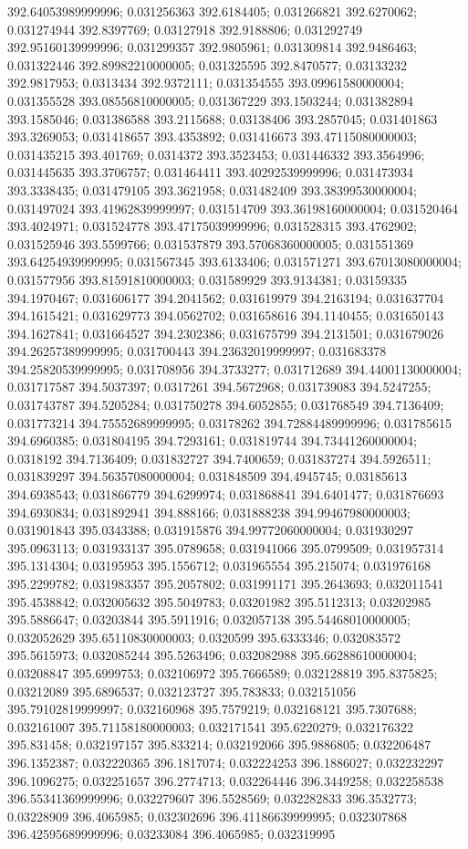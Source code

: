 392.64053989999996; 0.031256363 392.6184405; 0.031266821 392.6270062; 0.031274944 392.8397769; 0.03127918 392.9188806; 0.031292749 392.95160139999996; 0.031299357 392.9805961; 0.031309814 392.9486463; 0.031322446 392.89982210000005; 0.031325595 392.8470577; 0.03133232 392.9817953; 0.0313434 392.9372111; 0.031354555 393.09961580000004; 0.031355528 393.08556810000005; 0.031367229 393.1503244; 0.031382894 393.1585046; 0.031386588 393.2115688; 0.03138406 393.2857045; 0.031401863 393.3269053; 0.031418657 393.4353892; 0.031416673 393.47115080000003; 0.031435215 393.401769; 0.0314372 393.3523453; 0.031446332 393.3564996; 0.031445635 393.3706757; 0.031464411 393.40292539999996; 0.031473934 393.3338435; 0.031479105 393.3621958; 0.031482409 393.38399530000004; 0.031497024 393.41962839999997; 0.031514709 393.36198160000004; 0.031520464 393.4024971; 0.031524778 393.47175039999996; 0.031528315 393.4762902; 0.031525946 393.5599766; 0.031537879 393.57068360000005; 0.031551369 393.64254939999995; 0.031567345 393.6133406; 0.031571271 393.67013080000004; 0.031577956 393.81591810000003; 0.031589929 393.9134381; 0.03159335 394.1970467; 0.031606177 394.2041562; 0.031619979 394.2163194; 0.031637704 394.1615421; 0.031629773 394.0562702; 0.031658616 394.1140455; 0.031650143 394.1627841; 0.031664527 394.2302386; 0.031675799 394.2131501; 0.031679026 394.26257389999995; 0.031700443 394.23632019999997; 0.031683378 394.25820539999995; 0.031708956 394.3733277; 0.031712689 394.44001130000004; 0.031717587 394.5037397; 0.0317261 394.5672968; 0.031739083 394.5247255; 0.031743787 394.5205284; 0.031750278 394.6052855; 0.031768549 394.7136409; 0.031773214 394.75552689999995; 0.03178262 394.72884489999996; 0.031785615 394.6960385; 0.031804195 394.7293161; 0.031819744 394.73441260000004; 0.0318192 394.7136409; 0.031832727 394.7400659; 0.031837274 394.5926511; 0.031839297 394.56357080000004; 0.031848509 394.4945745; 0.03185613 394.6938543; 0.031866779 394.6299974; 0.031868841 394.6401477; 0.031876693 394.6930834; 0.031892941 394.888166; 0.031888238 394.99467980000003; 0.031901843 395.0343388; 0.031915876 394.99772060000004; 0.031930297 395.0963113; 0.031933137 395.0789658; 0.031941066 395.0799509; 0.031957314 395.1314304; 0.03195953 395.1556712; 0.031965554 395.215074; 0.031976168 395.2299782; 0.031983357 395.2057802; 0.031991171 395.2643693; 0.032011541 395.4538842; 0.032005632 395.5049783; 0.03201982 395.5112313; 0.03202985 395.5886647; 0.03203844 395.5911916; 0.032057138 395.54468010000005; 0.032052629 395.65110830000003; 0.0320599 395.6333346; 0.032083572 395.5615973; 0.032085244 395.5263496; 0.032082988 395.66288610000004; 0.03208847 395.6999753; 0.032106972 395.7666589; 0.032128819 395.8375825; 0.03212089 395.6896537; 0.032123727 395.783833; 0.032151056 395.79102819999997; 0.032160968 395.7579219; 0.032168121 395.7307688; 0.032161007 395.71158180000003; 0.032171541 395.6220279; 0.032176322 395.831458; 0.032197157 395.833214; 0.032192066 395.9886805; 0.032206487 396.1352387; 0.032220365 396.1817074; 0.032224253 396.1886027; 0.032232297 396.1096275; 0.032251657 396.2774713; 0.032264446 396.3449258; 0.032258538 396.55341369999996; 0.032279607 396.5528569; 0.032282833 396.3532773; 0.03228909 396.4065985; 0.032302696 396.41186639999995; 0.032307868 396.42595689999996; 0.03233084 396.4065985; 0.032319995 